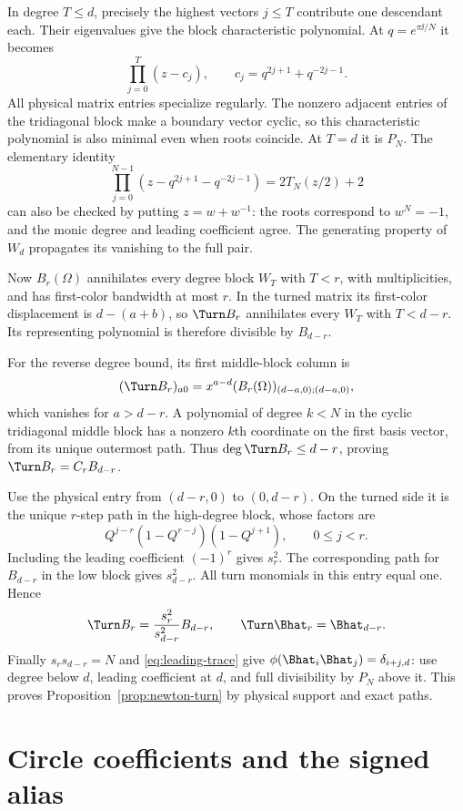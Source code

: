 In degree $T\le d$, precisely the highest vectors $j\le T$ contribute one descendant each. Their eigenvalues give the block characteristic polynomial. At $q=e^{\pi\ii/N}$ it becomes
\[
 \prod_{j=0}^{T}(z-c_j),\qquad c_j=q^{2j+1}+q^{-2j-1}.
\]
All physical matrix entries specialize regularly. The nonzero adjacent entries of the tridiagonal block make a boundary vector cyclic, so this characteristic polynomial is also minimal even when roots coincide. At $T=d$ it is $P_N$. The elementary identity
\[
 \prod_{j=0}^{N-1}(z-q^{2j+1}-q^{-2j-1})=2T_N(z/2)+2
\]
can also be checked by putting $z=w+w^{-1}$: the roots correspond to $w^N=-1$, and the monic degree and leading coefficient agree. The generating property of $W_d$ propagates its vanishing to the full pair.

Now $B_r(\Omega)$ annihilates every degree block $W_T$ with $T<r$, with multiplicities, and has first-color bandwidth at most $r$. In the turned matrix its first-color displacement is $d-(a+b)$, so $\Turn B_r$ annihilates every $W_T$ with $T<d-r$. Its representing polynomial is therefore divisible by $B_{d-r}$.

For the reverse degree bound, its first middle-block column is
\[
 (\Turn B_r)_{a0}=x^{a-d}(B_r(\Omega))_{(d-a,0);(d-a,0)},
\]
which vanishes for $a>d-r$. A polynomial of degree $k<N$ in the cyclic tridiagonal middle block has a nonzero $k$th coordinate on the first basis vector, from its unique outermost path. Thus $\deg\Turn B_r\le d-r$, proving $\Turn B_r=C_rB_{d-r}$.

Use the physical entry from $(d-r,0)$ to $(0,d-r)$. On the turned side it is the unique $r$-step path in the high-degree block, whose factors are
\[
 Q^{j-r}(1-Q^{r-j})(1-Q^{j+1}),\qquad0\le j<r.
\]
Including the leading coefficient $(-1)^r$ gives $s_r^2$. The corresponding path for $B_{d-r}$ in the low block gives $s_{d-r}^2$. All turn monomials in this entry equal one. Hence
\[
 \Turn B_r=\frac{s_r^2}{s_{d-r}^2}B_{d-r},
 \qquad \Turn\Bhat_r=\Bhat_{d-r}.
\]
Finally $s_rs_{d-r}=N$ and \eqref{eq:leading-trace} give
$\phi(\Bhat_i\Bhat_j)=\delta_{i+j,d}$: use degree below $d$, leading coefficient at $d$, and full divisibility by $P_N$ above it. This proves Proposition~\ref{prop:newton-turn} by physical support and exact paths.

\section{Circle coefficients and the signed alias}\label{app:colors}

